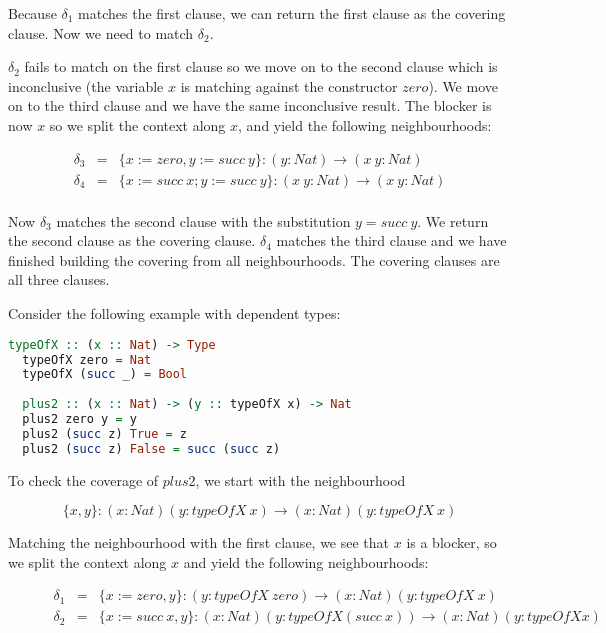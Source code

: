 Because $\delta_1$ matches the first clause, we can return the first clause as the covering clause. Now we need to match $\delta_2$.

$\delta_2$ fails to match on the first clause so we move on to the second clause which is inconclusive (the variable $x$ is matching against the constructor $zero$). We move on to the third clause and we have the same inconclusive result. The blocker is now $x$ so we split the context along $x$, and yield the following neighbourhoods:

\begin{figure}[H]
  \begin{equation*}
    \begin{aligned}
      \delta_3 & = & \{x := zero, y := succ \ y\} : (y : Nat) \to (x \ y : Nat) \\
      \delta_4 & = & \{x := succ \ x; y := succ \ y\} : (x \ y : Nat) \to (x \ y : Nat) \\
    \end{aligned}
  \end{equation*}
\end{figure}

Now $\delta_3$ matches the second clause with the substitution $y = succ \ y$. We return the second clause as the covering clause. $\delta_4$ matches the third clause and we have finished building the covering from all neighbourhoods. The covering clauses are all three clauses.

Consider the following example with dependent types:

\begin{lstlisting}[language=haskell]
  typeOfX :: (x :: Nat) -> Type
  typeOfX zero = Nat
  typeOfX (succ _) = Bool
  
  plus2 :: (x :: Nat) -> (y :: typeOfX x) -> Nat
  plus2 zero y = y
  plus2 (succ z) True = z
  plus2 (succ z) False = succ (succ z)
\end{lstlisting}

To check the coverage of $plus2$, we start with the neighbourhood 

\[
  \{x,y\} : (x : Nat)(y : typeOfX \ x) \to (x : Nat)(y : typeOfX \ x)
\]

Matching the neighbourhood with the first clause, we see that $x$ is a blocker, so we split the context along $x$ and yield the following neighbourhoods:

\begin{figure}[H]
  \begin{equation*}
    \begin{aligned}
      \delta_1 & = & \{x := zero, y\} : (y : typeOfX \ zero) \to (x : Nat)(y : typeOfX \ x) \\
      \delta_2 & = & \{x := succ \ x, y\} : (x : Nat)(y : typeOfX (succ \ x)) \to (x : Nat)(y : typeOfX x) \\
    \end{aligned}
  \end{equation*}
\end{figure}

